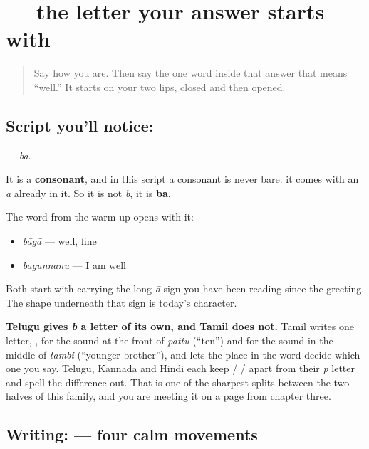 \section[\texorpdfstring{\te{బ} (ba)}{బ (ba)}]{ — the letter your answer starts with}

\label{lesson:TE-S157-letter-ba}



\begin{quote}
Say how you are. Then say the one word inside that answer that means \textquotedblleft{}well.\textquotedblright{} It starts on your two lips, closed and then opened.
\end{quote}

\subsection*{Script you'll notice: }
\textbf{} — \emph{ba}.

It is a \textbf{consonant}, and in this script a consonant is never bare: it comes with an \emph{a} already in it. So it is not \emph{b}, it is \textbf{ba}.

The word from the warm-up opens with it:

\begin{itemize}
\raggedright
  \item \textbf{} \emph{bāgā} — well, fine
  \item \textbf{} \emph{bāgunnānu} — I am well
\end{itemize}

Both start with  carrying the long-\emph{ā} sign you have been reading since the greeting. The shape underneath that sign is today's character.

\textbf{Telugu gives \emph{b} a letter of its own, and Tamil does not.} Tamil writes one letter, , for the sound at the front of \emph{pattu} (\textquotedblleft{}ten\textquotedblright{}) and for the sound in the middle of \textbf{} \emph{tambi} (\textquotedblleft{}younger brother\textquotedblright{}), and lets the place in the word decide which one you say. Telugu, Kannada and Hindi each keep  /  /  apart from their \emph{p} letter and spell the difference out. That is one of the sharpest splits between the two halves of this family, and you are meeting it on a page from chapter three.

\subsection*{Writing:  — four calm movements}

